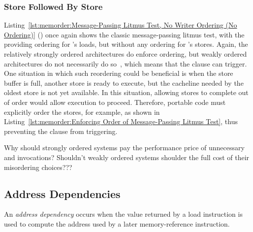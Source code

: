 \subsubsection{Store Followed By Store}
\label{sec:memorder:Store Followed By Store}

Listing~\ref{lst:memorder:Message-Passing Litmus Test, No Writer Ordering (No Ordering)}
()
once again shows the classic message-passing litmus test, with the
 providing ordering for 's loads, but without
any ordering for 's stores.
Again, the relatively strongly ordered architectures do enforce ordering,
but weakly ordered architectures do not necessarily do
so~\cite{JadeAlglave2011ppcmem}, which means that the
 clause can trigger.
One situation in which such reordering could be beneficial is when
the store buffer is full, another store is ready to execute, but the
cacheline needed by the oldest store is not yet available.
In this situation, allowing stores to complete out of order would
allow execution to proceed.
Therefore, portable code must explicitly order the stores, for
example, as shown in
Listing~\ref{lst:memorder:Enforcing Order of Message-Passing Litmus Test},
thus preventing the  clause from triggering.

\QuickQuiz{}
	Why should strongly ordered systems pay the performance price
	of unnecessary  and  invocations?
	Shouldn't weakly ordered systems shoulder the full cost of
	their misordering choices???
 \QuickQuizEnd

\subsection{Address Dependencies}
\label{sec:memorder:Address Dependencies}

An \emph{address dependency} occurs when the value returned by a load
instruction is used to compute the address used by a later memory-reference
instruction.

